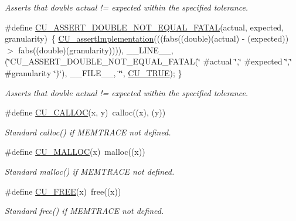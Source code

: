 \begin{DoxyCompactItemize}
\begin{DoxyCompactList}\small\item\em Asserts that double actual != expected within the specified tolerance. \end{DoxyCompactList}\item 
\#define \hyperlink{group___framework_ga934dd0005a515631aeae60535488d3b5}{C\+U\+\_\+\+A\+S\+S\+E\+R\+T\+\_\+\+D\+O\+U\+B\+L\+E\+\_\+\+N\+O\+T\+\_\+\+E\+Q\+U\+A\+L\+\_\+\+F\+A\+T\+A\+L}(actual, expected, granularity)~\{ \hyperlink{group___framework_gad409fc536d9d3fb5f659c76421e8ce3b}{C\+U\+\_\+assert\+Implementation}(((fabs((double)(actual) -\/ (expected)) $>$ fabs((double)(granularity)))), \+\_\+\+\_\+\+L\+I\+N\+E\+\_\+\+\_\+, (\char`\"{}C\+U\+\_\+\+A\+S\+S\+E\+R\+T\+\_\+\+D\+O\+U\+B\+L\+E\+\_\+\+N\+O\+T\+\_\+\+E\+Q\+U\+A\+L\+\_\+\+F\+A\+T\+A\+L(\char`\"{} \#actual \char`\"{},\char`\"{}  \#expected \char`\"{},\char`\"{} \#granularity \char`\"{})\char`\"{}), \+\_\+\+\_\+\+F\+I\+L\+E\+\_\+\+\_\+, \char`\"{}\char`\"{}, \hyperlink{group___framework_ga99641394bc766ca9c4a295e942fed1ef}{C\+U\+\_\+\+T\+R\+U\+E}); \}
\begin{DoxyCompactList}\small\item\em Asserts that double actual != expected within the specified tolerance. \end{DoxyCompactList}\item 
\#define \hyperlink{group___framework_gaef1d8826851fd285cc3961461713d2ad}{C\+U\+\_\+\+C\+A\+L\+L\+O\+C}(x, y)~calloc((x), (y))
\begin{DoxyCompactList}\small\item\em Standard calloc() if M\+E\+M\+T\+R\+A\+C\+E not defined. \end{DoxyCompactList}\item 
\#define \hyperlink{group___framework_gaf3c485ccdf034c746dbd00a05940c819}{C\+U\+\_\+\+M\+A\+L\+L\+O\+C}(x)~malloc((x))
\begin{DoxyCompactList}\small\item\em Standard malloc() if M\+E\+M\+T\+R\+A\+C\+E not defined. \end{DoxyCompactList}\item 
\#define \hyperlink{group___framework_ga24a922b67c81baa3d7821fb425e094f4}{C\+U\+\_\+\+F\+R\+E\+E}(x)~free((x))
\begin{DoxyCompactList}\small\item\em Standard free() if M\+E\+M\+T\+R\+A\+C\+E not defined. \end{DoxyCompactList}\item 

\end{DoxyCompactItemize}
